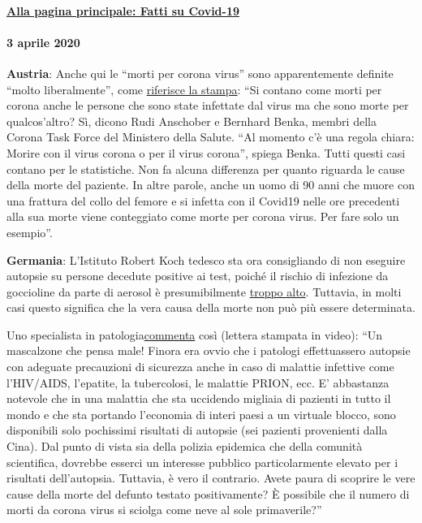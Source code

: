 \hypertarget{alla-pagina-principale-fatti-su-covid-19}{%
\paragraph{\texorpdfstring{\href{https://swprs.org/un-medico-svizzero-su-covid-19/}{Alla
pagina principale: Fatti su
Covid-19}}{Alla pagina principale: Fatti su Covid-19}}\label{alla-pagina-principale-fatti-su-covid-19}}

\hypertarget{3-aprile-2020}{%
\paragraph{3 aprile 2020}\label{3-aprile-2020}}

\textbf{Austria}: Anche qui le ``morti per corona virus'' sono
apparentemente definite ``molto liberalmente'', come
\href{https://www.heute.at/s/osterreich-bei-corona-todesstatistik-sehr-liberal-48665863}{riferisce
la stampa}: ``Si contano come morti per corona anche le persone che sono
state infettate dal virus ma che sono morte per qualcos'altro? Sì,
dicono Rudi Anschober e Bernhard Benka, membri della Corona Task Force
del Ministero della Salute. ``Al momento c'è una regola chiara: Morire
con il virus corona o per il virus corona'', spiega Benka. Tutti questi
casi contano per le statistiche. Non fa alcuna differenza per quanto
riguarda le cause della morte del paziente. In altre parole, anche un
uomo di 90 anni che muore con una frattura del collo del femore e si
infetta con il Covid19 nelle ore precedenti alla sua morte viene
conteggiato come morte per corona virus. Per fare solo un esempio''.

\textbf{Germania}: L'Istituto Robert Koch tedesco sta ora consigliando
di non eseguire autopsie su persone decedute positive ai test, poiché il
rischio di infezione da goccioline da parte di aerosol è presumibilmente
\href{https://www.youtube.com/watch?v=gSn_YaOYYcY}{troppo alto}.
Tuttavia, in molti casi questo significa che la vera causa della morte
non può più essere determinata.

Uno specialista in
patologia\href{https://www.youtube.com/watch?v=gSn_YaOYYcY}{commenta}
così (lettera stampata in video): ``Un mascalzone che pensa male! Finora
era ovvio che i patologi effettuassero autopsie con adeguate precauzioni
di sicurezza anche in caso di malattie infettive come l'HIV/AIDS,
l'epatite, la tubercolosi, le malattie PRION, ecc. E' abbastanza
notevole che in una malattia che sta uccidendo migliaia di pazienti in
tutto il mondo e che sta portando l'economia di interi paesi a un
virtuale blocco, sono disponibili solo pochissimi risultati di autopsie
(sei pazienti provenienti dalla Cina). Dal punto di vista sia della
polizia epidemica che della comunità scientifica, dovrebbe esserci un
interesse pubblico particolarmente elevato per i risultati
dell'autopsia. Tuttavia, è vero il contrario. Avete paura di scoprire le
vere cause della morte del defunto testato positivamente? È possibile
che il numero di morti da corona virus si sciolga come neve al sole
primaverile?''


